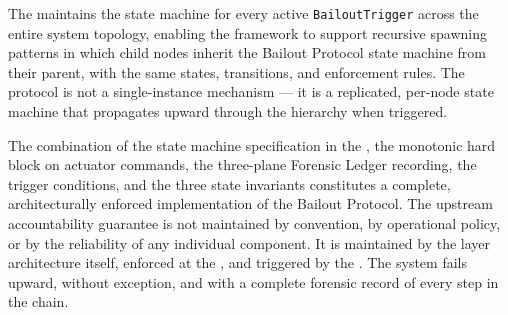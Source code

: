 The \fact{} maintains the state machine for every active \texttt{BailoutTrigger} across the entire system topology, enabling the framework to support recursive spawning patterns in which child nodes inherit the Bailout Protocol state machine from their parent, with the same states, transitions, and enforcement rules. The protocol is not a single-instance mechanism — it is a replicated, per-node state machine that propagates upward through the hierarchy when triggered.

The combination of the state machine specification in the \fact{}, the monotonic hard block on actuator commands, the three-plane Forensic Ledger recording, the \bounds{} trigger conditions, and the three state invariants constitutes a complete, architecturally enforced implementation of the Bailout Protocol. The upstream accountability guarantee is not maintained by convention, by operational policy, or by the reliability of any individual component. It is maintained by the layer architecture itself, enforced at the \fact{}, and triggered by the \bounds{}. The system fails upward, without exception, and with a complete forensic record of every step in the chain.